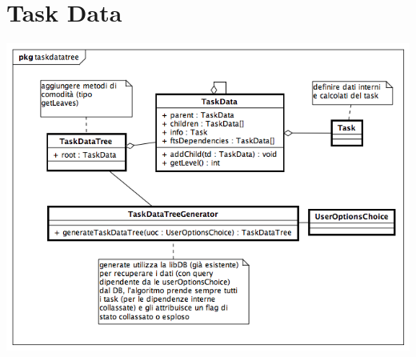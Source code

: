 \documentclass[a4paper, 12pt]{report}
\begin{document}
\section{Task Data}
\includegraphics[width=\textwidth]{diagramma_classe/taskdatatree.png}
\end{document}

